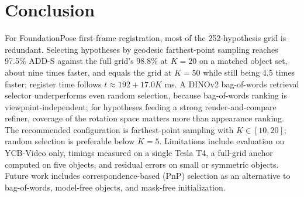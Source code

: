 \documentclass[10pt,twocolumn,letterpaper]{article}
\begin{document}
\section{Conclusion}
For FoundationPose first-frame registration, most of the 252-hypothesis grid is redundant. Selecting hypotheses by geodesic farthest-point sampling reaches 97.5\% ADD-S against the full grid's 98.8\% at $K{=}20$ on a matched object set, about nine times faster, and equals the grid at $K{=}50$ while still being 4.5 times faster; register time follows $t \approx 192 + 17.0K$ ms. A DINOv2 bag-of-words retrieval selector underperforms even random selection, because bag-of-words ranking is viewpoint-independent; for hypotheses feeding a strong render-and-compare refiner, coverage of the rotation space matters more than appearance ranking. The recommended configuration is farthest-point sampling with $K \in [10, 20]$; random selection is preferable below $K{=}5$. Limitations include evaluation on YCB-Video only, timings measured on a single Tesla T4, a full-grid anchor computed on five objects, and residual errors on small or symmetric objects. Future work includes correspondence-based (PnP) selection as an alternative to bag-of-words, model-free objects, and mask-free initialization.
\end{document}
